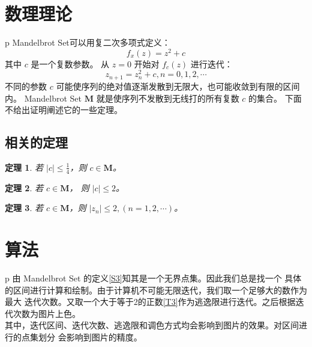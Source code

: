 \documentclass{ctexart}
\begin{document}
    \section{数理理论}\label{S3}
    \begin{tabular}{p\columnwidth}
        Mandelbrot Set可以用复二次多项式定义：
        \begin{equation}
            \label{E1}
            f_x(z) = z^2 + c
        \end{equation}
        其中 $c$ 是一个复数参数。
        从 $z = 0$ 开始对 $f_c(z)$ 进行迭代：
        \begin{equation}
            \label{E2}
            z_{n+1} = z_n^2 + c, n = 0,1,2,\cdots
        \end{equation}
        不同的参数 $c$ 可能使序列的绝对值逐渐发散到无限大，也可能收敛到有限的区间内。
        Mandelbrot Set $\mathbf{M}$ 就是使序列不发散到无线打的所有复数 $c$ 的集合。
        下面不给出证明阐述它的一些定理。
    \end{tabular}
    \subsection{相关的定理}\label{S31}
    \newtheorem{theorem}{定理}
    \begin{theorem}\label{T1}
        若 $|c| \leqslant \frac14 $，则 $c\in\mathbf M$。
    \end{theorem}
    \begin{theorem}\label{T2}
        若 $c \in \mathbf{M}$， 则 $|c| \leqslant 2$。
    \end{theorem}
    \begin{theorem}\label{T3}
        若 $c\in \mathbf{M}$，则 $|z_n| \leqslant 2,(n=1,2,\cdots)$。
    \end{theorem}
    \section{算法}\label{S4}
    \begin{tabular}{p\columnwidth}
        由 Mandelbrot Set 的定义\autoref{S3}知其是一个无界点集。因此我们总是找一个
        具体的区间进行计算和绘制。由于计算机不可能无限迭代，我们取一个足够大的数作为最大
        迭代次数。又取一个大于等于2的正数\eqref{T3}作为逃逸限进行迭代。之后根据迭代次数为图片上色。\\
        其中，迭代区间、迭代次数、逃逸限和调色方式均会影响到图片的效果。对区间进行的点集划分
        会影响到图片的精度。
    \end{tabular}
\end{document}
